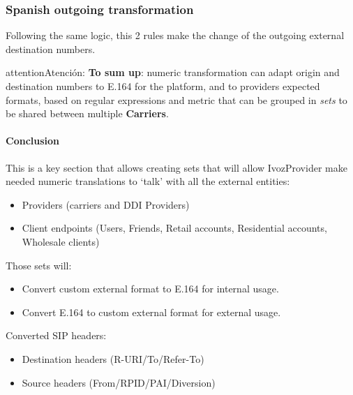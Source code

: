 \documentclass[letterpaper,10pt,spanish]{sphinxmanual}
\begin{document}
\subsubsection{Spanish outgoing transformation}
\label{administration_portal/brand/settings/numeric_transformations:spanish-outgoing-transformation}
Following the same logic, this 2 rules make the change of the outgoing external
destination numbers.

\begin{notice}{attention}{Atención:}
\textbf{To sum up}: numeric transformation can adapt origin and
destination numbers to E.164 for the platform, and to providers expected
formats, based on regular expressions and metric that can be grouped in \emph{sets}
to be shared between multiple \textbf{Carriers}.
\end{notice}


\paragraph{Conclusion}
\label{administration_portal/brand/settings/numeric_transformations:conclusion}
This is a key section that allows creating sets that will allow IvozProvider make needed numeric translations to `talk'
with all the external entities:
\begin{itemize}
\item {} 
Providers (carriers and DDI Providers)

\item {} 
Client endpoints (Users, Friends, Retail accounts, Residential accounts, Wholesale clients)

\end{itemize}

Those sets will:
\begin{itemize}
\item {} 
Convert custom external format to E.164 for internal usage.

\item {} 
Convert E.164 to custom external format for external usage.

\end{itemize}

Converted SIP headers:
\begin{itemize}
\item {} 
Destination headers (R-URI/To/Refer-To)

\item {} 
Source headers (From/RPID/PAI/Diversion)

\end{itemize}
\end{document}
